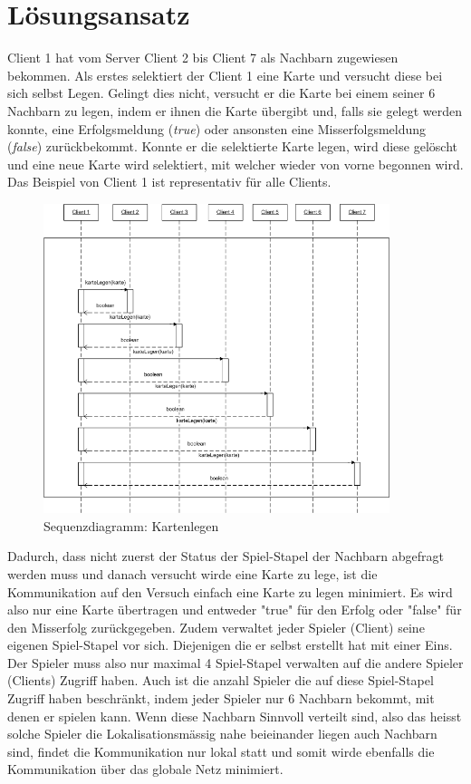 \section{Lösungsansatz} 

Client 1 hat vom Server Client 2 bis Client 7 als Nachbarn zugewiesen bekommen. Als erstes selektiert der Client 1 eine Karte und versucht diese bei sich selbst Legen. Gelingt dies nicht, versucht er die Karte bei einem seiner 6 Nachbarn zu legen, indem er ihnen die Karte übergibt und, falls sie gelegt werden konnte, eine Erfolgsmeldung (\textit{true}) oder ansonsten eine Misserfolgsmeldung (\textit{false}) zurückbekommt. Konnte er die selektierte Karte legen, wird diese gelöscht und eine neue Karte wird selektiert, mit welcher wieder von vorne begonnen wird. Das Beispiel von Client 1 ist representativ für alle Clients. 

\begin{figure}[hbt]
  \centering
  \includegraphics[width=0.90\textwidth,angle=0]{graphics/Kartenlegen_Sequenzdiagramm.png}
  \caption{Sequenzdiagramm: Kartenlegen}
\end{figure}

Dadurch, dass nicht zuerst der Status der Spiel-Stapel der Nachbarn abgefragt werden muss und danach versucht wirde eine Karte zu lege, ist die Kommunikation auf den Versuch einfach eine Karte zu legen minimiert. Es wird also nur eine Karte übertragen und entweder "true" für den Erfolg oder "false" für den Misserfolg zurückgegeben.
Zudem verwaltet jeder Spieler (Client) seine eigenen Spiel-Stapel vor sich. Diejenigen die er selbst erstellt hat mit einer Eins. Der Spieler muss also nur maximal 4 Spiel-Stapel verwalten auf die andere Spieler (Clients) Zugriff haben. 
Auch ist die anzahl Spieler die auf diese Spiel-Stapel Zugriff haben beschränkt, indem jeder Spieler nur 6 Nachbarn bekommt, mit denen er spielen kann. Wenn diese Nachbarn Sinnvoll verteilt sind, also das heisst solche Spieler die Lokalisationsmässig nahe beieinander liegen auch Nachbarn sind, findet die Kommunikation nur lokal statt und somit wirde ebenfalls die Kommunikation über das globale Netz minimiert.

